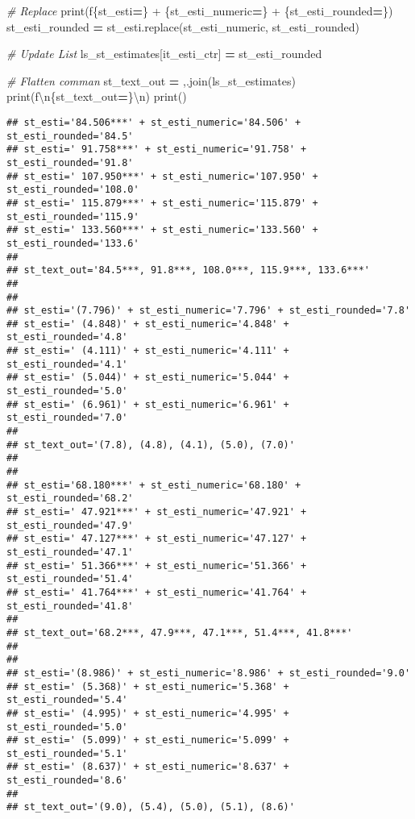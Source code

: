 \documentclass[
]{book}
\newenvironment{Shaded}{\begin{snugshade}}{\end{snugshade}}
\newcommand{\BuiltInTok}[1]{#1}
\newcommand{\CharTok}[1]{\textcolor[rgb]{0.31,0.60,0.02}{#1}}
\newcommand{\CommentTok}[1]{\textcolor[rgb]{0.56,0.35,0.01}{\textit{#1}}}
\newcommand{\NormalTok}[1]{#1}
\newcommand{\OperatorTok}[1]{\textcolor[rgb]{0.81,0.36,0.00}{\textbf{#1}}}
\newcommand{\SpecialCharTok}[1]{\textcolor[rgb]{0.00,0.00,0.00}{#1}}
\newcommand{\SpecialStringTok}[1]{\textcolor[rgb]{0.31,0.60,0.02}{#1}}
\newcommand{\StringTok}[1]{\textcolor[rgb]{0.31,0.60,0.02}{#1}}
\begin{document}
\begin{Shaded}
\begin{Highlighting}[]
        \CommentTok{\# Replace}
        \BuiltInTok{print}\NormalTok{(}\SpecialStringTok{f\textquotesingle{}}\SpecialCharTok{\{}\NormalTok{st\_esti}\OperatorTok{=}\SpecialCharTok{\}}\SpecialStringTok{ + }\SpecialCharTok{\{}\NormalTok{st\_esti\_numeric}\OperatorTok{=}\SpecialCharTok{\}}\SpecialStringTok{ + }\SpecialCharTok{\{}\NormalTok{st\_esti\_rounded}\OperatorTok{=}\SpecialCharTok{\}}\SpecialStringTok{\textquotesingle{}}\NormalTok{)}
\NormalTok{        st\_esti\_rounded }\OperatorTok{=}\NormalTok{ st\_esti.replace(st\_esti\_numeric, st\_esti\_rounded)}
        
        \CommentTok{\# Update List}
\NormalTok{        ls\_st\_estimates[it\_esti\_ctr] }\OperatorTok{=}\NormalTok{ st\_esti\_rounded}
    
    \CommentTok{\# Flatten comman}
\NormalTok{    st\_text\_out }\OperatorTok{=} \StringTok{\textquotesingle{},\textquotesingle{}}\NormalTok{.join(ls\_st\_estimates)}
    \BuiltInTok{print}\NormalTok{(}\SpecialStringTok{f\textquotesingle{}}\CharTok{\textbackslash{}n}\SpecialCharTok{\{}\NormalTok{st\_text\_out}\OperatorTok{=}\SpecialCharTok{\}}\CharTok{\textbackslash{}n}\SpecialStringTok{\textquotesingle{}}\NormalTok{)}
    \BuiltInTok{print}\NormalTok{()}
\end{Highlighting}
\end{Shaded}

\begin{verbatim}
## st_esti='84.506***' + st_esti_numeric='84.506' + st_esti_rounded='84.5'
## st_esti=' 91.758***' + st_esti_numeric='91.758' + st_esti_rounded='91.8'
## st_esti=' 107.950***' + st_esti_numeric='107.950' + st_esti_rounded='108.0'
## st_esti=' 115.879***' + st_esti_numeric='115.879' + st_esti_rounded='115.9'
## st_esti=' 133.560***' + st_esti_numeric='133.560' + st_esti_rounded='133.6'
## 
## st_text_out='84.5***, 91.8***, 108.0***, 115.9***, 133.6***'
## 
## 
## st_esti='(7.796)' + st_esti_numeric='7.796' + st_esti_rounded='7.8'
## st_esti=' (4.848)' + st_esti_numeric='4.848' + st_esti_rounded='4.8'
## st_esti=' (4.111)' + st_esti_numeric='4.111' + st_esti_rounded='4.1'
## st_esti=' (5.044)' + st_esti_numeric='5.044' + st_esti_rounded='5.0'
## st_esti=' (6.961)' + st_esti_numeric='6.961' + st_esti_rounded='7.0'
## 
## st_text_out='(7.8), (4.8), (4.1), (5.0), (7.0)'
## 
## 
## st_esti='68.180***' + st_esti_numeric='68.180' + st_esti_rounded='68.2'
## st_esti=' 47.921***' + st_esti_numeric='47.921' + st_esti_rounded='47.9'
## st_esti=' 47.127***' + st_esti_numeric='47.127' + st_esti_rounded='47.1'
## st_esti=' 51.366***' + st_esti_numeric='51.366' + st_esti_rounded='51.4'
## st_esti=' 41.764***' + st_esti_numeric='41.764' + st_esti_rounded='41.8'
## 
## st_text_out='68.2***, 47.9***, 47.1***, 51.4***, 41.8***'
## 
## 
## st_esti='(8.986)' + st_esti_numeric='8.986' + st_esti_rounded='9.0'
## st_esti=' (5.368)' + st_esti_numeric='5.368' + st_esti_rounded='5.4'
## st_esti=' (4.995)' + st_esti_numeric='4.995' + st_esti_rounded='5.0'
## st_esti=' (5.099)' + st_esti_numeric='5.099' + st_esti_rounded='5.1'
## st_esti=' (8.637)' + st_esti_numeric='8.637' + st_esti_rounded='8.6'
## 
## st_text_out='(9.0), (5.4), (5.0), (5.1), (8.6)'
\end{verbatim}
\end{document}
